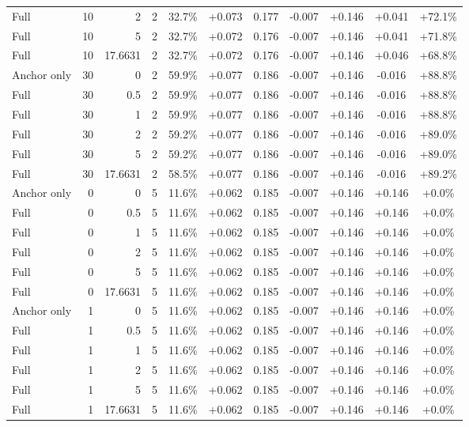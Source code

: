 \begin{table}[htbp]
\begin{tabular}{lrrrccccccc}
Full & 10 & 2 & 2 & 32.7\% & +0.073 & 0.177 & -0.007 & +0.146 & +0.041 & +72.1\% \\
Full & 10 & 5 & 2 & 32.7\% & +0.072 & 0.176 & -0.007 & +0.146 & +0.041 & +71.8\% \\
Full & 10 & 17.6631 & 2 & 32.7\% & +0.072 & 0.176 & -0.007 & +0.146 & +0.046 & +68.8\% \\
Anchor only & 30 & 0 & 2 & 59.9\% & +0.077 & 0.186 & -0.007 & +0.146 & -0.016 & +88.8\% \\
Full & 30 & 0.5 & 2 & 59.9\% & +0.077 & 0.186 & -0.007 & +0.146 & -0.016 & +88.8\% \\
Full & 30 & 1 & 2 & 59.9\% & +0.077 & 0.186 & -0.007 & +0.146 & -0.016 & +88.8\% \\
Full & 30 & 2 & 2 & 59.2\% & +0.077 & 0.186 & -0.007 & +0.146 & -0.016 & +89.0\% \\
Full & 30 & 5 & 2 & 59.2\% & +0.077 & 0.186 & -0.007 & +0.146 & -0.016 & +89.0\% \\
Full & 30 & 17.6631 & 2 & 58.5\% & +0.077 & 0.186 & -0.007 & +0.146 & -0.016 & +89.2\% \\
Anchor only & 0 & 0 & 5 & 11.6\% & +0.062 & 0.185 & -0.007 & +0.146 & +0.146 & +0.0\% \\
Full & 0 & 0.5 & 5 & 11.6\% & +0.062 & 0.185 & -0.007 & +0.146 & +0.146 & +0.0\% \\
Full & 0 & 1 & 5 & 11.6\% & +0.062 & 0.185 & -0.007 & +0.146 & +0.146 & +0.0\% \\
Full & 0 & 2 & 5 & 11.6\% & +0.062 & 0.185 & -0.007 & +0.146 & +0.146 & +0.0\% \\
Full & 0 & 5 & 5 & 11.6\% & +0.062 & 0.185 & -0.007 & +0.146 & +0.146 & +0.0\% \\
Full & 0 & 17.6631 & 5 & 11.6\% & +0.062 & 0.185 & -0.007 & +0.146 & +0.146 & +0.0\% \\
Anchor only & 1 & 0 & 5 & 11.6\% & +0.062 & 0.185 & -0.007 & +0.146 & +0.146 & +0.0\% \\
Full & 1 & 0.5 & 5 & 11.6\% & +0.062 & 0.185 & -0.007 & +0.146 & +0.146 & +0.0\% \\
Full & 1 & 1 & 5 & 11.6\% & +0.062 & 0.185 & -0.007 & +0.146 & +0.146 & +0.0\% \\
Full & 1 & 2 & 5 & 11.6\% & +0.062 & 0.185 & -0.007 & +0.146 & +0.146 & +0.0\% \\
Full & 1 & 5 & 5 & 11.6\% & +0.062 & 0.185 & -0.007 & +0.146 & +0.146 & +0.0\% \\
Full & 1 & 17.6631 & 5 & 11.6\% & +0.062 & 0.185 & -0.007 & +0.146 & +0.146 & +0.0\% \\

\end{tabular}
\end{table}
